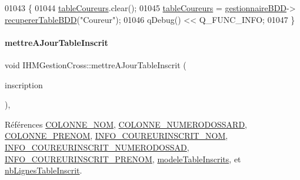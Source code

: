 \begin{DoxyCode}
01043 \{
01044     \hyperlink{class_i_h_m_gestion_cross_a9bf93b48403da7bf152f013055152630}{tableCoureurs}.clear();
01045     \hyperlink{class_i_h_m_gestion_cross_a9bf93b48403da7bf152f013055152630}{tableCoureurs} = \hyperlink{class_i_h_m_gestion_cross_a440bac63a3e51db3e2c08e883f8cafc9}{gestionnaireBDD}->
      \hyperlink{class_gestion_b_d_d_a2b44ebc5bf5b1a7babde6512817a85b4}{recupererTableBDD}(\textcolor{stringliteral}{"Coureur"});
01046     qDebug() << Q\_FUNC\_INFO;
01047 \}
\end{DoxyCode}
\mbox{\label{class_i_h_m_gestion_cross_a3c96fb9d92e9392ea83b380c3648bf55}} 
\paragraph{\texorpdfstring{mettre\+A\+Jour\+Table\+Inscrit}{mettreAJourTableInscrit}}
{\footnotesize\ttfamily void I\+H\+M\+Gestion\+Cross\+::mettre\+A\+Jour\+Table\+Inscrit (\begin{DoxyParamCaption}\item[{Q\+String\+List}]{inscription }\end{DoxyParamCaption})\hspace{0.3cm}{\ttfamily [private]}, {\ttfamily [slot]}}



Références \hyperlink{ihmchronocross_8h_aeee76385895c145ef5a633e6c6812603}{C\+O\+L\+O\+N\+N\+E\+\_\+\+N\+OM}, \hyperlink{ihmgestioncross_8h_a20d627e7b24ae715fda576e69408ae3f}{C\+O\+L\+O\+N\+N\+E\+\_\+\+N\+U\+M\+E\+R\+O\+D\+O\+S\+S\+A\+RD}, \hyperlink{ihmchronocross_8h_a5d6f240d26209cd66db8aa5e1aac62f9}{C\+O\+L\+O\+N\+N\+E\+\_\+\+P\+R\+E\+N\+OM}, \hyperlink{ihmgestioncross_8h_aa5b4e42123269ad7f574258d5bbb9cda}{I\+N\+F\+O\+\_\+\+C\+O\+U\+R\+E\+U\+R\+I\+N\+S\+C\+R\+I\+T\+\_\+\+N\+OM}, \hyperlink{ihmgestioncross_8h_a460662db33a6d68eead7d488ee61a76c}{I\+N\+F\+O\+\_\+\+C\+O\+U\+R\+E\+U\+R\+I\+N\+S\+C\+R\+I\+T\+\_\+\+N\+U\+M\+E\+R\+O\+D\+O\+S\+S\+AD}, \hyperlink{ihmgestioncross_8h_a73a7d4efe208177f86cc761b0d5fd089}{I\+N\+F\+O\+\_\+\+C\+O\+U\+R\+E\+U\+R\+I\+N\+S\+C\+R\+I\+T\+\_\+\+P\+R\+E\+N\+OM}, \hyperlink{class_i_h_m_gestion_cross_a19565551280115e642ceb9790c7317bc}{modele\+Table\+Inscrits}, et \hyperlink{class_i_h_m_gestion_cross_ad33a263cb137ae991a9be57dacc6760a}{nb\+Lignes\+Table\+Inscrit}.



